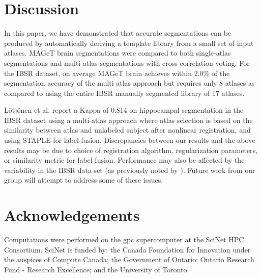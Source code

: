 \documentclass{article}\usepackage{graphicx, color}
\begin{document}
\section{Discussion}

In this paper, we have demonstrated that accurate segmentations can be produced
by automatically deriving a template library from a small set of input atlases.
MAGeT brain segmentations were compared to both single-atlas segmentations and
multi-atlas segmentations with cross-correlation voting.  For the IBSR dataset,
on average MAGeT brain achieves within 2.0\% of the segmentation accuracy of
the multi-atlas approach but requires only 8 atlases as compared to using the
entire IBSR manually segmented library of 17 atlases.

L\"{o}tj\"{o}nen et al.\cite{Lotjonen2010} report a Kappa of 0.814 on
hippocampal segmentation in the IBSR dataset using a multi-atlas approach where
atlas selection is based on the similarity between atlas and unlabeled subject
after nonlinear registration, and using STAPLE\cite{Warfield2004} for label
fusion.  Discrepancies between our results and the above results may be due to
choice of registration algorithm, regularization parameters, or similarity
metric for label fusion.  Performance may also be affected by the variability
in the IBSR data set (as previously noted by \cite{Klein2009}).  Future work
from our group will attempt to address some of these issues.

\section{Acknowledgements}
Computations were performed on the gpc supercomputer at the SciNet HPC
Consortium\cite{Loken2010}. SciNet is funded by: the Canada Foundation for
Innovation under the auspices of Compute Canada; the Government of Ontario;
Ontario Research Fund - Research Excellence; and the University of Toronto.



\end{document}
